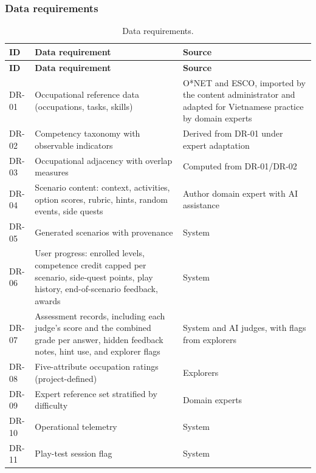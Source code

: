 \subsubsection{Data requirements}

{\small{}\renewcommand{\arraystretch}{1.1}
\begin{longtable}{|>{\raggedright\arraybackslash}p{}|>{\raggedright\arraybackslash}p{}|>{\raggedright\arraybackslash}p{}|}
\caption{Data requirements.} \\
\hline
\textbf{ID} & \textbf{Data requirement} & \textbf{Source} \\ \hline
\endfirsthead
\hline
\textbf{ID} & \textbf{Data requirement} & \textbf{Source} \\ \hline
\endhead
DR-01 & Occupational reference data (occupations, tasks, skills) & O*NET and ESCO, imported by the content administrator and adapted for Vietnamese practice by domain experts \\ \hline
DR-02 & Competency taxonomy with observable indicators & Derived from DR-01 under expert adaptation \\ \hline
DR-03 & Occupational adjacency with overlap measures & Computed from DR-01/DR-02 \\ \hline
DR-04 & Scenario content: context, activities, option scores, rubric, hints, random events, side quests & Author domain expert with AI assistance \\ \hline
DR-05 & Generated scenarios with provenance & System \\ \hline
DR-06 & User progress: enrolled levels, competence credit capped per scenario, side-quest points, play history, end-\allowbreak{}of-\allowbreak{}scenario feedback, awards & System \\ \hline
DR-07 & Assessment records, including each judge's score and the combined grade per answer, hidden feedback notes, hint use, and explorer flags & System and AI judges, with flags from explorers \\ \hline
DR-08 & Five-\allowbreak{}attribute occupation ratings (project-\allowbreak{}defined) & Explorers \\ \hline
DR-09 & Expert reference set stratified by difficulty & Domain experts \\ \hline
DR-10 & Operational telemetry & System \\ \hline
DR-11 & Play-test session flag & System \\ \hline

\end{longtable}}
